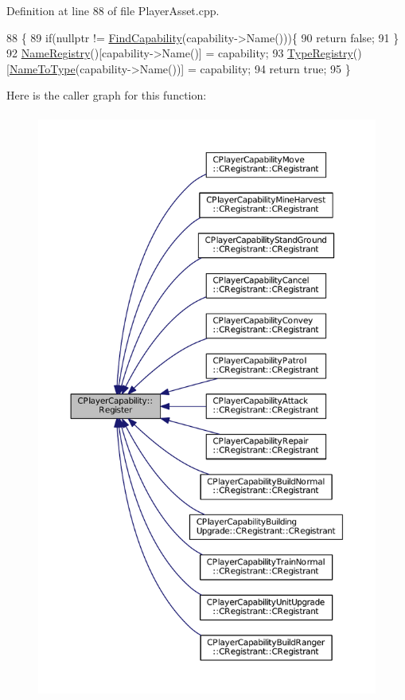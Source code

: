 Definition at line 88 of file Player\+Asset.\+cpp.


\begin{DoxyCode}
88                                                                              \{
89     \textcolor{keywordflow}{if}(\textcolor{keyword}{nullptr} != \hyperlink{classCPlayerCapability_a881ba4b87385d7cfe5cb6ced2d26f226}{FindCapability}(capability->Name()))\{
90         \textcolor{keywordflow}{return} \textcolor{keyword}{false};    
91     \}
92     \hyperlink{classCPlayerCapability_aa804d42c236f11ec9549057c22699837}{NameRegistry}()[capability->Name()] = capability;
93     \hyperlink{classCPlayerCapability_ab7fee932703792663278b1b2128f00f3}{TypeRegistry}()[\hyperlink{classCPlayerCapability_a920a696526e8a839f728192aea0ba1c5}{NameToType}(capability->Name())] = capability;
94     \textcolor{keywordflow}{return} \textcolor{keyword}{true};
95 \}
\end{DoxyCode}
Here is the caller graph for this function\+:
\nopagebreak
\begin{figure}[H]
\begin{center}
\leavevmode
\includegraphics[height=550pt]{classCPlayerCapability_a7e298018dcde2684451add3cfff065f7_icgraph}
\end{center}
\end{figure}
\hypertarget{classCPlayerCapability_a022d6efcdc0897253d7c2e33ade0851d}{}\label{classCPlayerCapability_a022d6efcdc0897253d7c2e33ade0851d} 

